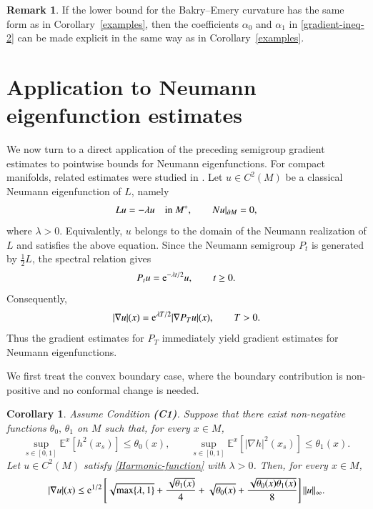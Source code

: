 \documentclass[11pt,twoside, reqno]{article}
\def\e{{\rm e}}
\newcommand\1{\mathbbm{1}}
\newtheorem{corollary}[theorem]{Corollary}
\theoremstyle{definition}
\newtheorem{remark}[theorem]{Remark}
\numberwithin{equation}{section}
\def \e{{\rm e}}
\begin{document}
\begin{remark}
If the lower bound for the Bakry--Emery curvature has the same form as in
Corollary~\ref{examples}, then the coefficients \(\alpha_0\) and
\(\alpha_1\) in \eqref{gradient-ineq-2} can be made explicit in the same way
as in Corollary~\ref{examples}.
\end{remark}


\section{Application to Neumann eigenfunction estimates}
We now turn to a direct application of the preceding semigroup gradient
estimates to pointwise bounds for Neumann eigenfunctions.  For compact manifolds, related estimates were studied in \cite{ArnaudonThalmaierWang2020, ChengThalmaierWang2024Hessian}. 
 Let \(u\in C^2(M)\) be a classical
Neumann eigenfunction of \(L\), namely
\begin{align}\label{Harmonic-function}
        Lu=-\lambda u \quad \hbox{in } M^\circ,
        \qquad
        Nu|_{\partial M}=0,
\end{align}
where \(\lambda>0\). Equivalently, \(u\) belongs to the domain of the
Neumann realization of \(L\) and satisfies the above equation.
Since the Neumann semigroup \(P_t\) is generated by \(\frac12L\), the spectral relation gives
\[
        P_tu=\e^{-\lambda t/2}u,\qquad t\geq0.
\]
Consequently,
\[
        |\nabla u|(x)=\e^{\lambda T/2}|\nabla P_Tu|(x),
        \qquad T>0.
\]
Thus the gradient estimates for \(P_T\) immediately yield gradient estimates
for Neumann eigenfunctions.  

We first treat the convex boundary case, where the boundary contribution is
non-positive and no conformal change is needed.  

\begin{corollary}\label{cor:neumann-eigen-convex}
Assume Condition {\bf(C1)}. Suppose that there exist non-negative
functions \({\theta}_0,\, {\theta}_1\) on \(M\) such that, for every \(x\in M\),
\[
        \sup_{s\in [0,1] }\mathbb E^x[h^2(x_s)]\leq  {\theta}_0(x),
        \qquad
        \sup_{s\in [0, 1] }\mathbb E^x[|\nabla h|^2(x_s)]
        \leq  {\theta}_1(x).
\]
Let \(u\in C^2(M)\) satisfy \eqref{Harmonic-function}
with \(\lambda>0\). Then, for every \(x\in M\),
\[
        |\nabla u|(x) \leq
        \e^{1/2}
        \left[
        \sqrt{\max\{\lambda,  1\}}
        +
        \frac{\sqrt{{\theta}_1(x)}}{4}
        +
        \sqrt{{\theta}_0(x)}
        +
        \frac{\sqrt{{\theta}_0(x) {\theta}_1(x)}}{8}
        \right]
        \|u\|_{\infty}.
\]
\end{corollary}
\end{document}
